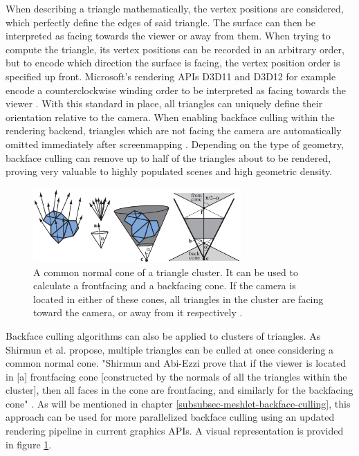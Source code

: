 \noindent
When describing a triangle mathematically, the vertex positions are considered, which perfectly define the edges of 
said triangle. The surface can then be interpreted as facing towards the viewer or away from them. 
When trying to compute the triangle, its vertex positions can be recorded in an arbitrary order, but to encode which 
direction the surface is facing, the vertex position order is specified up front. Microsoft's rendering \ac{API}s D3D11 
and D3D12 for example encode a counterclockwise winding order to be interpreted as facing towards the viewer 
\cite{D3DTopology2020}. With this standard in place, all triangles can uniquely define their orientation relative to 
the camera. When enabling backface culling within the rendering backend, triangles which are not facing the camera 
are automatically omitted immediately after screenmapping \cite{AkenineMoeller2018}. Depending on the type of geometry, 
backface culling can remove up to half of the triangles about to be rendered, proving very valuable to highly populated 
scenes and high geometric density.

\begin{figure}[h]
    \centering
    \includegraphics[width=300px]{images/graphics/cluster-backface-culling.jpg}
    \caption{A common normal cone of a triangle cluster. It can be used to calculate a frontfacing
    and a backfacing cone. If the camera is located in either of these cones, all triangles in the 
    cluster are facing toward the camera, or away from it respectively \cite{AkenineMoeller2018}.}
    \label{fig:cluster-backface-culling}
\end{figure}

\noindent 
Backface culling algorithms can also be applied to clusters of triangles. As Shirmun et al. \cite{Shirmun1993} propose, 
multiple triangles can be culled at once considering a common normal cone. "Shirmun and Abi-Ezzi \cite{Shirmun1993} 
prove that if the viewer is located in [a] frontfacing cone [constructed by the normals of all the triangles within the 
cluster], then all faces in the cone are frontfacing, and similarly for the backfacing cone" \cite{AkenineMoeller2018}. 
As will be mentioned in chapter \ref{subsubsec-meshlet-backface-culling}, this approach can be used for more 
parallelized backface culling using an updated rendering pipeline in current graphics \ac{API}s. A visual representation 
is provided in figure \ref{fig:cluster-backface-culling}.


